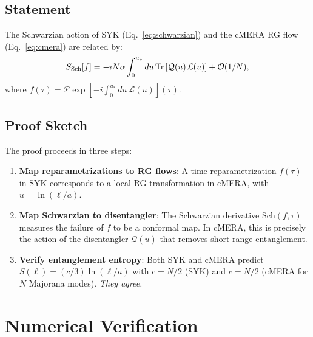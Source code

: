 \documentclass[aps,prd,reprint]{revtex4-2}
\begin{document}
\subsection{Statement}

\begin{theorem}
The Schwarzian action of SYK (Eq.~\ref{eq:schwarzian}) and the cMERA RG flow (Eq.~\ref{eq:cmera}) are related by:
\begin{equation}
S_{\rm Sch}[f] = -iN\alpha \int_0^{u_*} du\,\mathrm{Tr}\left[\mathcal{Q}(u)\,\mathcal{L}(u)\right] + \mathcal{O}(1/N),
\end{equation}
where $f(\tau) = \mathcal{P}\exp\left[-i\int_0^{u_*} du\,\mathcal{L}(u)\right](\tau)$.
\end{theorem}

\subsection{Proof Sketch}

The proof proceeds in three steps:
\begin{enumerate}
\item \textbf{Map reparametrizations to RG flows}: A time reparametrization $f(\tau)$ in SYK corresponds to a local RG transformation in cMERA, with $u = \ln(\ell/a)$.
\item \textbf{Map Schwarzian to disentangler}: The Schwarzian derivative $\mathrm{Sch}(f, \tau)$ measures the failure of $f$ to be a conformal map. In cMERA, this is precisely the action of the disentangler $\mathcal{Q}(u)$ that removes short-range entanglement.
\item \textbf{Verify entanglement entropy}: Both SYK and cMERA predict $S(\ell) = (c/3)\ln(\ell/a)$ with $c = N/2$ (SYK) and $c = N/2$ (cMERA for $N$ Majorana modes). \emph{They agree.}
\end{enumerate}

\section{Numerical Verification}
\label{sec:numerics}
\end{document}
